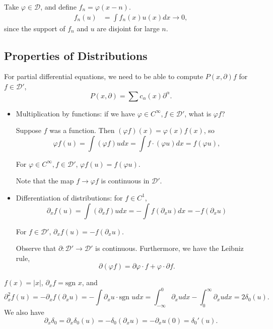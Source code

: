 \documentclass[11pt]{scrartcl}
\let \phi \varphi
\begin{document}
\begin{example} Take $\phi \in \mathcal D$, and define $f_n = \phi(x-n)$.  
\begin{align*}
f_n(u) &= \int f_n(x) u(x)dx \rightarrow 0,
\end{align*}
since the support of $f_n$ and $u$ are disjoint for large $n$.
\end{example}
\subsection{Properties of Distributions}
For partial differential equations, we need to be able to compute $P(x, \partial)f$ for $f \in \mathcal D'$,
$$P(x, \partial) = \sum c_\alpha(x) \partial^\alpha.$$

\begin{itemize}
\item Multiplication by functions: if we have $\phi \in C^{\infty}, f \in \mathcal D'$, what is $\phi f$?

Suppose $f$ was a function.  Then $(\phi f)(x) = \phi(x)f(x)$, so
$$\phi f(u) = \int (\phi f)udx = \int f \cdot (\phi u)dx = f(\phi u),$$
\begin{definition} For $\phi \in C^{\infty}, f \in \mathcal D'$, $\phi f(u) = f(\phi u)$.
\end{definition}
Note that the map $f \rightarrow \phi f$ is continuous in $\mathcal D'$.
\item Differentiation of distributions:  for $f \in C^1$, 
$$\partial_x f(u) = \int (\partial_x f) u dx = -\int f (\partial_x u)dx = -f(\partial_x u)$$
\begin{definition} For $f \in \mathcal D'$, $\partial_x f(u) = -f(\partial_x u).$
\end{definition}
Observe that $\partial: \mathcal D' \rightarrow \mathcal D'$ is continuous.  Furthermore, we have the Leibniz rule,
$$\partial(\phi f) = \partial \phi \cdot f + \phi \cdot \partial f.$$
\end{itemize}
\begin{example} $f(x) = |x|$, $\partial_x f = \text{sgn }x$, and 
$$\partial_x^2 f(u) = - \partial_x f(\partial_x u) = - \int \partial_x u \cdot \text{sgn }u dx = \int_{-\infty}^0 \partial_x u dx - \int_{0}^\infty  \partial_x u dx = 2 \delta_0(u).$$
We also have 
$$\partial_x \delta_0 = \partial_x \delta_0(u) = -\delta_0(\partial_x u) = -\partial_x u(0) = \delta_0'(u).$$
\end{example}
\end{document}
